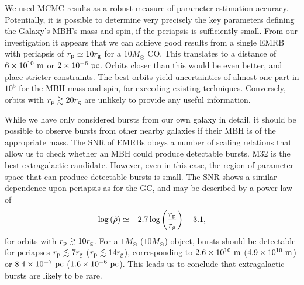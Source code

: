 We used MCMC results as a robust measure of parameter estimation accuracy. Potentially, it is possible to determine very precisely the key parameters defining the Galaxy's MBH's mass and spin, if the periapsis is sufficiently small. From our investigation it appears that we can achieve good results from a single EMRB with periapsis of $r_\mathrm{p} \simeq 10 r_\mathrm{g}$ for a $10 M_\odot$ CO. This translates to a distance of $6 \times 10^{10}~\mathrm{m}$ or $2 \times 10^{-6}~\mathrm{pc}$. Orbits closer than this would be even better, and place stricter constraints. The best orbits yield uncertainties of almost one part in $10^5$ for the MBH mass and spin, far exceeding existing techniques. Conversely, orbits with $r_\mathrm{p} \gtrsim 20 r_\mathrm{g}$ are unlikely to provide any useful information.

While we have only considered bursts from our own galaxy in detail, it should be possible to observe bursts from other nearby galaxies if their MBH is of the appropriate mass. The SNR of EMRBs obeys a number of scaling relations that allow us to check whether an MBH could produce detectable bursts. M32 is the best extragalactic candidate. However, even in this case, the region of parameter space that can produce detectable bursts is small. The SNR shows a similar dependence upon periapsis as for the GC, and may be described by a power-law of
\begin{equation}
\log\left(\hat{\rho}\right) \simeq -2.7\log\left(\frac{r_\mathrm{p}}{r_\mathrm{g}}\right) + 3.1,
\end{equation}
for orbits with $r_\mathrm{p} \gtrsim 10 r_\mathrm{g}$. For a $1 M_\odot$ ($10 M_\odot$) object, bursts should be detectable for periapses $r_\mathrm{p} \lesssim 7 r_\mathrm{g}$ ($r_\mathrm{p} \lesssim 14 r_\mathrm{g}$), corresponding to $2.6 \times 10^{10}~\mathrm{m}$ ($4.9 \times 10^{10}~\mathrm{m}$) or $8.4 \times 10^{-7}~\mathrm{pc}$ ($1.6 \times 10^{-6}~\mathrm{pc}$). This leads us to conclude that extragalactic bursts are likely to be rare.

